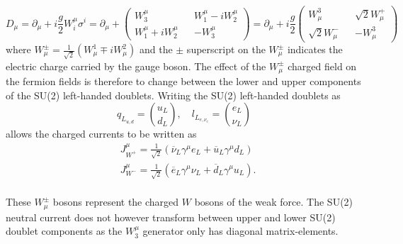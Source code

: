 \begin{equation}
  D_{\mu} = \partial_{\mu} + i\frac{g}{2}W^{\mu}_{i} \sigma^{i} = \partial_{\mu} + \begin{pmatrix} W^{\mu}_{3} && W^{\mu}_{1} - iW^{\mu}_{2}\\W^{\mu}_{1} + iW^{\mu}_{2} && -W^{\mu}_{3}\end{pmatrix} = \partial_{\mu} + i\frac{g}{2}\begin{pmatrix}W^{3}_{\mu} && \sqrt{2}W^{+}_{\mu}\\\sqrt{2}W^{-}_{\mu} && -W^{3}_{\mu}\end{pmatrix}
\end{equation}
where $W^{\pm}_{\mu} = \frac{1}{\sqrt{2}}(W^{1}_{\mu}\mp iW^{2}_{\mu})$ and the $\pm$ superscript on the $W^{\pm}_{\mu}$ indicates the electric charge carried by the gauge boson. The effect of the $W^{\pm}_{\mu}$ charged field on the fermion fields is therefore to change between the lower and upper components of the SU(2) left-handed doublets. Writing the SU(2) left-handed doublets as
\begin{equation}
    q_{L_{u,d}} = \binom{u_{L}}{d_{L}}, \quad l_{L_{e,\nu_{e}}} = \binom{e_{L}}{\nu_{L}}
\end{equation}
 allows the charged currents to be written as
 \begin{equation}
   \begin{split}
     &
     J_{W^{+}}^{\mu} = \frac{1}{\sqrt{2}}(\overline{\nu}_{L}\gamma^{\mu}e_{L} + \overline{u}_{L}\gamma^{\mu}d_{L}) \\
     &J_{W^{-}}^{\mu} = \frac{1}{\sqrt{2}}(\overline{e}_{L}\gamma^{\mu}\nu_{L} + \overline{d}_{L}\gamma^{\mu}u_{L}).\\
     \end{split}
  \label{eq:chargedcurrFUCK}
\end{equation}


These $W^{\pm}_{\mu}$ bosons represent the charged $W$ bosons of the weak force.
The SU(2) neutral current does not however transform between upper and lower SU(2) doublet components as the $W^{\mu}_{3}$ generator only has diagonal matrix-elements.




